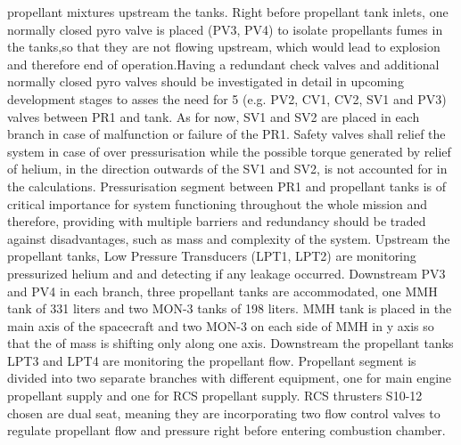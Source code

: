 propellant mixtures upstream the tanks. Right before propellant tank inlets, one normally closed pyro valve is placed (PV3, PV4) to isolate propellants fumes in the tanks,so that they are not flowing upstream, which would lead to explosion and therefore end of operation.Having a redundant check valves and additional normally closed pyro valves should be investigated in detail in upcoming development stages to asses the need for 5 (e.g. PV2, CV1, CV2, SV1 and PV3) valves between PR1 and tank. As for now, SV1 and SV2 are placed in each branch in case of malfunction or failure of the PR1. Safety valves shall relief the system in case of over pressurisation while the possible torque generated by relief of helium, in the direction outwards of the SV1 and SV2, is not accounted for in the calculations. Pressurisation segment between PR1 and propellant tanks is of critical importance for system functioning throughout the whole mission and therefore, providing with multiple barriers and redundancy should be traded against disadvantages, such as mass and complexity of the system. Upstream the propellant tanks, Low Pressure Transducers (LPT1, LPT2) are monitoring pressurized helium and and detecting if any leakage occurred. 
Downstream PV3 and PV4 in each branch, three propellant tanks are accommodated, one MMH tank of 331 liters and two MON-3 tanks of 198 liters. MMH tank is placed in the main axis of the spacecraft and two MON-3 on each side of MMH in y axis so that the of mass is shifting only along one axis. Downstream the propellant tanks LPT3 and LPT4 are monitoring the propellant flow. Propellant segment is divided into two separate branches with different equipment, one for main engine propellant supply and one for RCS propellant supply. RCS thrusters S10-12 chosen are dual seat, meaning they are incorporating two flow control valves to regulate propellant flow and pressure right before entering combustion chamber. 

